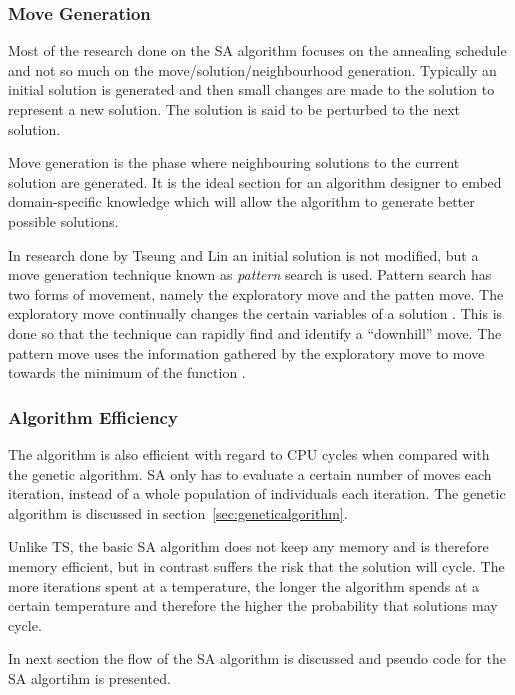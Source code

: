 \subsubsection{Move Generation}
Most of the research done on the \gls{SA} algorithm focuses on the annealing schedule and not so much on the move/solution/neighbourhood generation. Typically an initial solution is generated and then small changes are made to the solution to represent a new solution. The solution is said to be perturbed to the next solution.

Move generation is the phase where neighbouring solutions to the current solution are generated. It is the ideal section for an algorithm designer to embed domain-specific knowledge which will allow the algorithm to generate better possible solutions.

In research done by Tseung and Lin \cite{CurveFittingSA} an initial solution is not modified, but a move generation technique known as \emph{pattern} search is used. Pattern search has two forms of movement, namely the exploratory move and the patten move. The exploratory move continually changes the certain variables of a solution \cite{CurveFittingSA}. This is done so that the technique can rapidly find and identify a ``downhill'' move. The pattern move uses the information gathered by the exploratory move to move towards the minimum of the function \cite{CurveFittingSA}.
\subsubsection{Algorithm Efficiency}
The algorithm is also efficient with regard to CPU cycles when compared with the genetic algorithm. \gls{SA} only has to evaluate a certain number of moves each iteration, instead of a whole population of individuals each iteration. The genetic algorithm is discussed in section~\ref{sec:geneticalgorithm}.

Unlike \gls{TS}, the basic \gls{SA} algorithm does not keep any memory and is therefore memory efficient, but in contrast suffers the risk that the solution will cycle. The more iterations spent at a temperature, the longer the algorithm spends at a certain temperature and therefore the higher the probability that solutions may cycle.

In next section the flow of the \gls{SA} algorithm is discussed and pseudo code for the \gls{SA} algortihm is presented.

